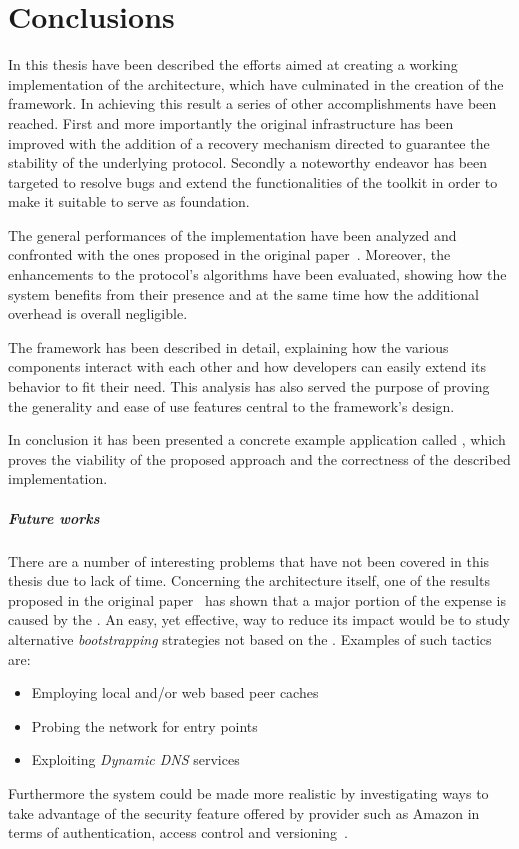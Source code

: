 \chapter{Conclusions}
In this thesis have been described the efforts aimed at creating a
working implementation of the \cloudcast architecture, which have
culminated in the creation of the \cloudypeer framework. In achieving
this result a series of other accomplishments have been reached. First
and more importantly the original \cloudcast infrastructure has been
improved with the addition of a recovery mechanism directed to
guarantee the stability of the underlying \peersampling
protocol. Secondly a noteworthy endeavor has been targeted to resolve
bugs and extend the functionalities of the \grapes toolkit in order
to make it suitable to serve as foundation.

The general performances of the implementation have been analyzed and
confronted with the ones proposed in the original
paper~\cite{Cloudcast}. Moreover, the enhancements to the protocol's
algorithms have been evaluated, showing how the system benefits from
their presence and at the same time how the additional overhead
is overall negligible.

The \cloudypeer framework has been described in detail, explaining how
the various components interact with each other and how developers can
easily extend its behavior to fit their need. This analysis has also
served the purpose of proving the generality and ease of use features
central to the framework's design.

In conclusion it has been presented a concrete example application
called \cloudyrss, which proves the viability of
the proposed approach and the correctness of the described
implementation.

\paragraph{Future works}
There are a number of interesting problems that have not been covered
in this thesis due to lack of time. Concerning the \cloudcast
architecture itself, one of the results proposed in the original
paper~\cite{Cloudcast} has shown that a major portion of the expense is
caused by the \peersampling. An easy, yet effective, way to reduce its
impact would be to study alternative \textit{bootstrapping} strategies
not based on the \cloud. Examples of such tactics are:
\begin{itemize}
  \item Employing local and/or web based peer
    caches~\cite{GnutellaWebCache}~\cite{P2PVPN}
  \item Probing the network for entry
    points~\cite{BootstrappingP2P}~\cite{BootstrappingP2PLocality}
    ~\cite{DecentralizedBootstrappingP2P}
    \item Exploiting \textit{Dynamic DNS}
      services~\cite{DecentralizedBootstrapping}
\end{itemize}
Furthermore the system could be made more realistic by investigating
ways to take advantage of the security feature offered by \cloud
provider such as Amazon in terms of authentication, access control and
versioning~\cite{AmazonS3DevGuide}.

